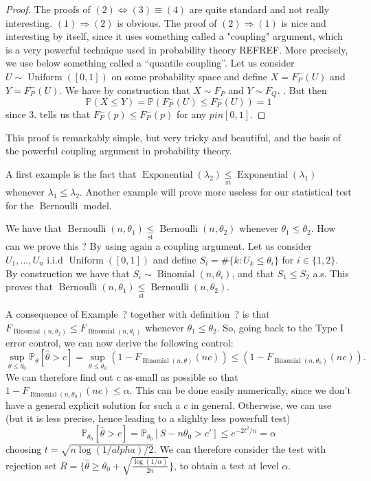 \documentclass[
	fontsize=11pt, %
	twoside=false, %
	numbers=noenddot, %
]{kaobook}
\DeclareMathOperator{\ber}{Bernoulli}
\DeclareMathOperator{\bin}{Binomial}
\DeclareMathOperator{\expo}{Exponential}
\DeclareMathOperator{\uni}{Uniform}
\renewcommand{\P}{\mathbb P}
\newcommand{\wh}{\widehat}
\newcommand{\lest}{\underset{\text{st}}{\leq}}
\begin{document}
\begin{proof}
	The proofs of $(2) \Leftrightarrow (3) \equiv (4)$ are quite standard and not really interesting. $(1) \Rightarrow (2)$ is obvious. The proof of $(2) \Rightarrow (1)$ is nice and interesting by itself, since it uses something called a "coupling" argument, which is a very powerful technique used in probability theory REFREF.
	More precisely, we use below something called a ``quantile coupling''.
	Let us consider $U \sim \uni([0, 1])$  on some probability space and define $X = F_P^-(U)$ and $Y = F_P^-(U)$.
	We have by construction that $X \sim F_P$ and $Y \sim F_Q$. . But then
	\begin{equation*}
		\P(X \leq Y) = \P(F_P^-(U) \leq F_P^-(U)) = 1
	\end{equation*}
	since 3. tells us that $F_P^-(p) \leq F_P^-(p)$ for any $p in [0, 1]$.
\end{proof}
This proof is remarkably simple, but very tricky and beautiful, and the basis of the powerful coupling argument in probability theory.

A first example is the fact that $\expo(\lambda_2) \lest \expo(\lambda_1)$ whenever $\lambda_1 \leq \lambda_2$.
Another example will prove more useless for our statistical test for the $\ber$ model.
\begin{example}
	We have that $\ber(n, \theta_1) \lest \ber(n, \theta_2)$ whenever $\theta_1 \leq \theta_2$. How can we prove this ? By using again a coupling argument.
	Let us consider $U_1, \ldots, U_n$ i.i.d $\uni([0, 1])$ and define $S_i = \# \{ k : U_k \leq \theta_i \}$ for $i \in \{ 1, 2 \}$. By construction we have that $S_i \sim \bin(n, \theta_i)$, and that $S_1 \leq S_2$ a.s. This proves that $\ber(n, \theta_1) \lest \ber(n, \theta_2)$.
\end{example}
A consequence of Example~? together with definition~? is that $F_{\bin(n, \theta_2)} \leq F_{\bin(n, \theta_1)}$ whenever $\theta_1 \leq \theta_2$.
So, going back to the Type I error control, we can now derive the following control:
\begin{equation*}
	\sup_{\theta \leq \theta_0} \P_\theta[ \wh \theta > c] = \sup_{\theta \leq \theta_0} (1 - F_{\bin(n, \theta)}(n c)) \leq (1 - F_{\bin(n, \theta_0)}(n c)).
\end{equation*}
We can therefore find out $c$ as small as possible so that $1 - F_{\bin(n, \theta_0)}(n c) \leq \alpha$.
This can be done easily numerically, since we don't have a general explicit solution for such a $c$ in general.
Otherwise, we can use (but it is less precise, hence leading to a slighlty less powerfull test)
\begin{equation*}
	\P_{\theta_0} [\wh \theta > c] = \P_{\theta_0}[S - n \theta_0 > c'] \leq e^{-2 t^2 / n} = \alpha
\end{equation*}
choosing $t = \sqrt{n \log(1 / alpha) / 2}$. 
We can therefore consider the test with rejection set $R = \{ \wh \theta \geq \theta_0 + \sqrt{ \frac{\log(1 / \alpha)}{2n}}\}$, to obtain a test at level $\alpha$.
\end{document}
